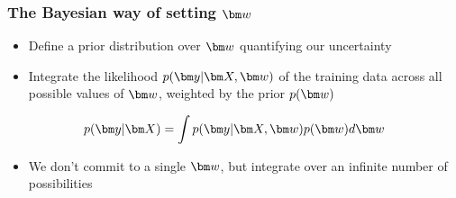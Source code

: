
\begin{frame}
\frametitle{The Bayesian way of setting $\bw$}

\begin{itemize}
\item Define a \alert{prior distribution over $\bw$} quantifying our uncertainty
\item Integrate the likelihood $p(\by|\bX,\bw)$ of the training data across all possible values of $\bw$, weighted by the prior $p(\bw)$
\end{itemize}

\renewcommand\theequation{2.\thedefcounter}
\setcounter{defcounter}{6}
\begin{equation}
p(\by|\bX) = \int p(\by|\bX,\bw) p(\bw) d\bw
\label{eq:integrated_likelihood}
\end{equation}

\begin{itemize}
\item \alert{We don't commit to a single $\bw$, but integrate over an infinite number of possibilities}
\end{itemize}

\end{frame}


